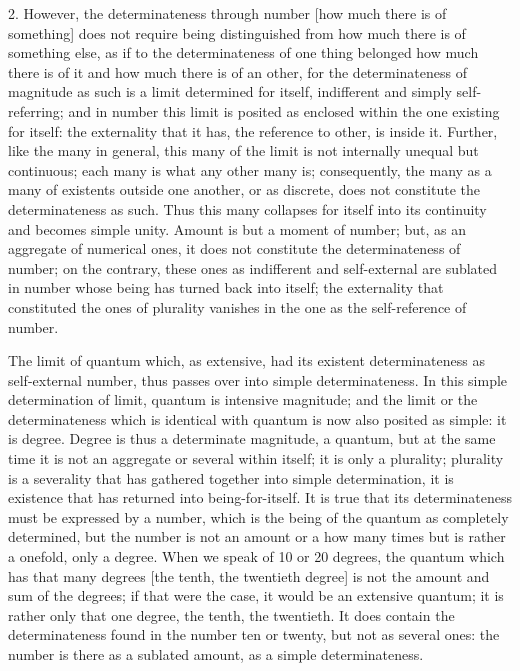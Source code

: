 2. However, the determinateness through number
[how much there is of something]
does not require being distinguished from
how much there is of something else,
as if to the determinateness of one thing belonged
how much there is of it
and how much there is of an other,
for the determinateness of magnitude as such
is a limit determined for itself,
indifferent and simply self-referring;
and in number this limit is posited
as enclosed within the one existing for itself:
the externality that it has,
the reference to other, is inside it.
Further, like the many in general,
this many of the limit is
not internally unequal but continuous;
each many is what any other many is;
consequently, the many as a many of
existents outside one another,
or as discrete, does not constitute
the determinateness as such.
Thus this many collapses for itself
into its continuity and becomes simple unity.
Amount is but a moment of number;
but, as an aggregate of numerical ones,
it does not constitute the determinateness of number;
on the contrary, these ones as indifferent and self-external are
sublated in number whose being has turned back into itself;
the externality that constituted the ones of plurality vanishes
in the one as the self-reference of number.

The limit of quantum which, as extensive,
had its existent determinateness as self-external number,
thus passes over into simple determinateness.
In this simple determination of limit,
quantum is intensive magnitude;
and the limit or the determinateness
which is identical with quantum is now
also posited as simple: it is degree.
Degree is thus a determinate magnitude, a quantum,
but at the same time it is not an aggregate
or several within itself;
it is only a plurality;
plurality is a severality that has gathered
together into simple determination,
it is existence that has returned into being-for-itself.
It is true that its determinateness must be expressed by a number,
which is the being of the quantum as completely determined,
but the number is not an amount or a how many times
but is rather a onefold, only a degree.
When we speak of 10 or 20 degrees,
the quantum which has that many degrees
[the tenth, the twentieth degree]
is not the amount and sum of the degrees;
if that were the case, it would be an extensive quantum;
it is rather only that one degree, the tenth, the twentieth.
It does contain the determinateness found in
the number ten or twenty,
but not as several ones:
the number is there as a sublated amount,
as a simple determinateness.

